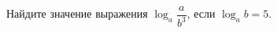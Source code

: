 \begin{ex}
	\begin{condition}
		Найдите значение выражения \( \log_a\dfrac{a}{b^3} \), если \( \log_a b = 5 \).
	\end{condition}
\end{ex}
